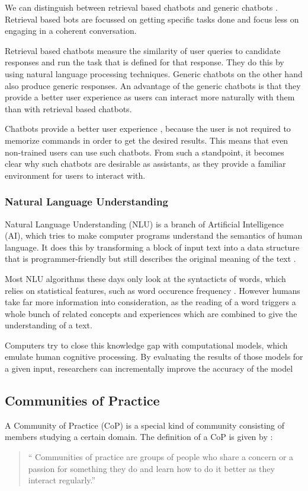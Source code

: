 We can distinguish between retrieval based chatbots and generic chatbots \cite{NLKl19,WWX*16}.
Retrieval based bots are focussed on getting specific tasks done and focus less on engaging in a coherent conversation.

Retrieval based chatbots measure the similarity of user queries to candidate responses and run the task that is defined for that response.
They do this by using natural language processing techniques.
Generic chatbots on the other hand also produce generic responses.
An advantage of the generic chatbots is that they provide a better user experience as users can interact more naturally with them than with retrieval based chatbots.

Chatbots provide a better user experience \cite{CHW*17}, because the user is not required to memorize commands in order to get the desired results.
This means that even non-trained users can use such chatbots.
From such a standpoint, it becomes clear why such chatbots are desirable as assistants, as they provide a familiar environment for users to interact with.

\subsubsection{Natural Language Understanding}
Natural Language Understanding (NLU) is a branch of Artificial Intelligence (AI), which tries to make computer programs understand the semantics of human language.
It does this by transforming a block of input text into a data structure that is programmer-friendly but still describes the original meaning of the text \cite{CWB*11}.

Most NLU algorithms these days only look at the syntacticts of words, which relies on statistical features, such as word occurence frequency \cite{CaWh14}.
However humans take far more information into consideration, as the reading of a word triggers a whole bunch of related concepts and experiences which are combined to give the understanding of a text.

Computers try to close this knowledge gap with computational models, which emulate human cognitive processing.
By evaluating the results of those models for a given input, researchers can incrementally improve the accuracy of the model \cite{CaWh14}


\subsection{Communities of Practice}
A Community of Practice (CoP) is a special kind of community consisting of members studying a certain domain.
The definition of a CoP is given by \cite{Weng98}:
\begin{quote}
	``
	Communities of practice are groups of people who share a concern or a passion for something they do and learn how to do it better as they interact regularly.''
\end{quote}

